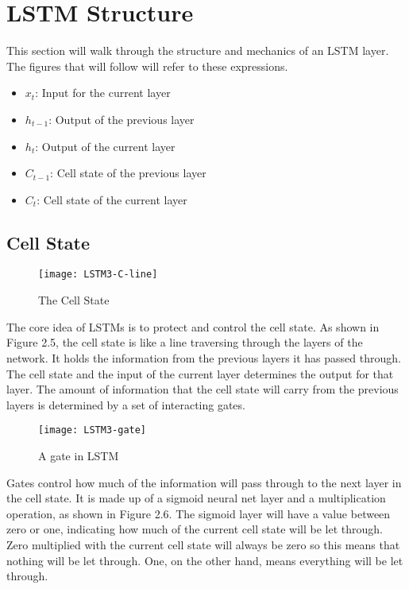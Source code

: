 \section{LSTM Structure}
    This section will walk through the structure and mechanics of an LSTM layer. The figures that will follow will refer to these expressions.
        \begin{itemize}
        \item \( x_t \): Input for the current layer
        \item \( h_{t-1} \): Output of the previous layer
        \item \( h_t \): Output of the current layer
        \item \( C_{t-1} \): Cell state of the previous layer
        \item \( C_t \): Cell state of the current layer
        \end{itemize}

    \subsection{Cell State}
        \begin{figure}[h]
        \centering
        \texttt{[image: LSTM3-C-line]}
        \caption{The Cell State}
        \end{figure}
        The core idea of LSTMs is to protect and control the cell state. As shown in Figure 2.5, the cell state is like a line traversing through the layers of the network. It holds the information from the previous layers it has passed through. The cell state and the input of the current layer determines the output for that layer. The amount of information that the cell state will carry from the previous layers is determined by a set of interacting gates.

        \begin{figure}[h]
        \centering
        \texttt{[image: LSTM3-gate]}
        \caption{A gate in LSTM}
        \end{figure}
        Gates control how much of the information will pass through to the next layer in the cell state. It is made up of a sigmoid neural net layer and a multiplication operation, as shown in Figure 2.6. The sigmoid layer will have a value between zero or one, indicating how much of the current cell state will be let through. Zero multiplied with the current cell state will always be zero so this means that nothing will be let through. One, on the other hand, means everything will be let through.

